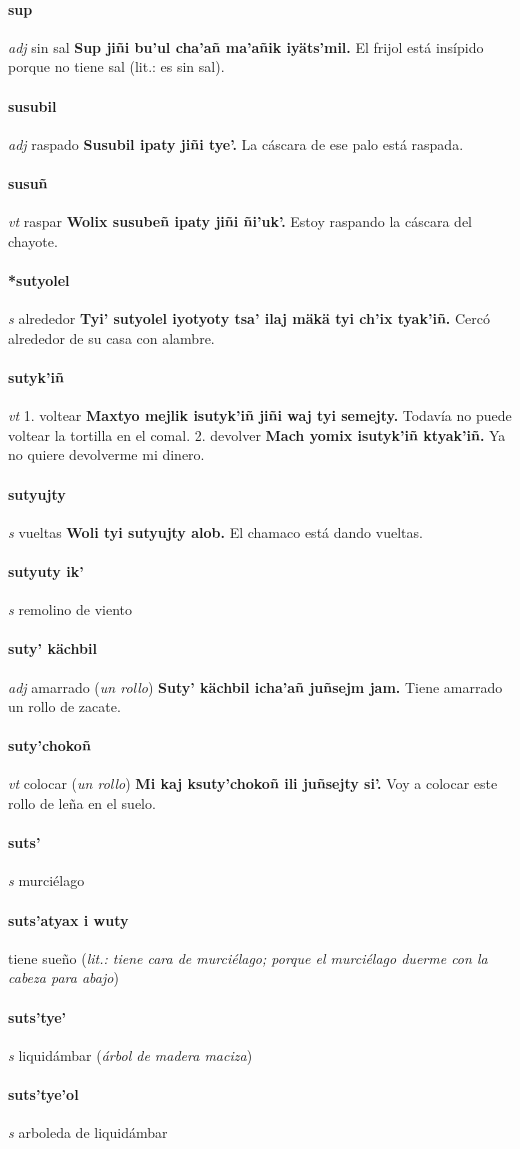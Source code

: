 \documentclass{scrbook}
\newcommand{\entry}[1]{\paragraph{#1}}
\newcommand{\onedefinition}[1]{#1.}
\newcommand{\partofspeech}[1]{\textit{#1}}
\newcommand{\spanishtranslation}[1]{#1}
\newcommand{\clarification}[1]{(\textit{#1})}
\newcommand{\cholexample}[1]{\textbf{#1}}
\newcommand{\exampletranslation}[1]{#1}
\begin{document}
\begin{multicols}{2}
\entry{sup}
\partofspeech{adj}
\spanishtranslation{sin sal}
\cholexample{Sup jiñi bu'ul cha'añ ma'añik iyäts'mil.}
\exampletranslation{El frijol está insípido porque no tiene sal (lit.: es sin sal).}

\entry{susubil}
\partofspeech{adj}
\spanishtranslation{raspado}
\cholexample{Susubil ipaty jiñi tye'.}
\exampletranslation{La cáscara de ese palo está raspada.}

\entry{susuñ}
\partofspeech{vt}
\spanishtranslation{raspar}
\cholexample{Wolix susubeñ ipaty jiñi ñi'uk'.}
\exampletranslation{Estoy raspando la cáscara del chayote.}

\entry{*sutyolel}
\partofspeech{s}
\spanishtranslation{alrededor}
\cholexample{Tyi' sutyolel iyotyoty tsa' ilaj mäkä tyi ch'ix tyak'iñ.}
\exampletranslation{Cercó alrededor de su casa con alambre.}

\entry{sutyk'iñ}
\partofspeech{vt}
\onedefinition{1}
\spanishtranslation{voltear}
\cholexample{Maxtyo mejlik isutyk'iñ jiñi waj tyi semejty.}
\exampletranslation{Todavía no puede voltear la tortilla en el comal.}
\onedefinition{2}
\spanishtranslation{devolver}
\cholexample{Mach yomix isutyk'iñ ktyak'iñ.}
\exampletranslation{Ya no quiere devolverme mi dinero.}

\entry{sutyujty}
\partofspeech{s}
\spanishtranslation{vueltas}
\cholexample{Woli tyi sutyujty alob.}
\exampletranslation{El chamaco está dando vueltas.}

\entry{sutyuty ik'}
\partofspeech{s}
\spanishtranslation{remolino de viento}

\entry{suty' kächbil}
\partofspeech{adj}
\spanishtranslation{amarrado}
\clarification{un rollo}
\cholexample{Suty' kächbil icha'añ juñsejm jam.}
\exampletranslation{Tiene amarrado un rollo de zacate.}

\entry{suty'chokoñ}
\partofspeech{vt}
\spanishtranslation{colocar}
\clarification{un rollo}
\cholexample{Mi kaj ksuty'chokoñ ili juñsejty si'.}
\exampletranslation{Voy a colocar este rollo de leña en el suelo.}

\entry{suts'}
\partofspeech{s}
\spanishtranslation{murciélago}

\entry{suts'atyax i wuty}
\spanishtranslation{tiene sueño}
\clarification{lit.: tiene cara de murciélago; porque el murciélago duerme con la cabeza para abajo}

\entry{suts'tye'}
\partofspeech{s}
\spanishtranslation{liquidámbar}
\clarification{árbol de madera maciza}

\entry{suts'tye'ol}
\partofspeech{s}
\spanishtranslation{arboleda de liquidámbar}


\end{multicols}
\end{document}
